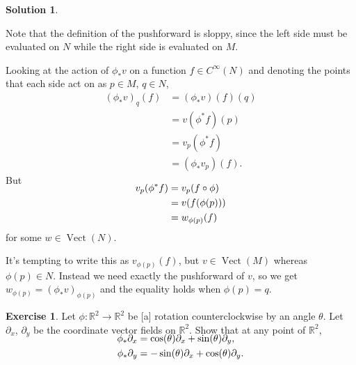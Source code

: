 \documentclass[11pt, a4paper]{report}
\theoremstyle{definition}
\newtheorem{exercise}{Exercise}[part]
\newtheorem{solution}{Solution}[part]
\newenvironment{ex}{\begin{exercise}}{\end{exercise}\pagebreak[1]}
\newenvironment{sol}{\begin{solution}}{\end{solution}\pagebreak[3]}
\DeclareMathOperator{\Vect}{Vect}
\begin{document}
\begin{sol}\label{sol:pushforwardvectorfield}

Note that the definition of the pushforward is sloppy, since the left side must be evaluated on $N$ while the right side is evaluated on $M$.

Looking at the action of $\phi_* v$ on a function $f \in C^\infty (N)$ and denoting the points that each side act on as $p \in M$, $q \in N$,
\begin{align*}
    {(\phi_* v)}_q (f) &= (\phi_* v) (f) (q) \\
                       &= v(\phi^* f)(p) \\
                       &= v_p(\phi^* f) \\
                       &= (\phi_* v_p)(f).
\end{align*}
But
\begin{align*}
    \SwapAboveDisplaySkip
    v_p (\phi^* f) &= v_p (f \circ \phi) \\
                   &= v(f(\phi(p))) \\
                   &= w_{\phi(p)}(f)
\end{align*}
for some $w \in \Vect(N)$.

It's tempting to write this as $v_{\phi(p)}(f)$, but $v \in \Vect(M)$ whereas $\phi(p) \in N$.
Instead we need exactly the pushforward of $v$, so we get $w_{\phi(p)} = {(\phi_* v)}_{\phi(p)}$ and the equality holds when $\phi(p) = q$.

\end{sol}

\begin{ex}

Let $\phi: \mathbb{R}^2 \to \mathbb{R}^2$ be [a] rotation counterclockwise by an angle $\theta$. Let $\partial_x$, $\partial_y$ be the coordinate vector fields on $\mathbb{R}^2$. Show that at any point of $\mathbb{R}^2$,
\begin{align*}
    \SwapAboveDisplaySkip
    \phi_* \partial_x &= \cos(\theta) \partial_x + \sin(\theta) \partial_y, \\
    \phi_* \partial_y &= -\sin(\theta) \partial_x + \cos(\theta) \partial_y.
\end{align*}

\end{ex}
\end{document}
